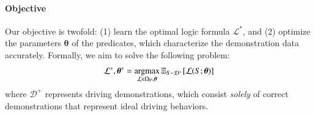 \paragraph{Objective}
Our objective is twofold: (1) learn the optimal logic formula $\mathcal{L}^*$, and (2) optimize the parameters $\boldsymbol{\theta}$ of the predicates, which characterize the demonstration data accurately.
Formally, we aim to solve the following problem:
\begin{align}
    \mathcal{L}^*, \boldsymbol{\theta}^* = \mathop{\mathrm{argmax}}_{\mathcal{L} \in \Omega_{\mathcal{P}}, \boldsymbol{\theta}} \mathbb{E}_{S \sim \mathcal{D}^+} [\mathcal{L}(S; \boldsymbol{\theta})]
    \label{eq:objective}
\end{align}
where $\mathcal{D}^+$ represents driving demonstrations, which consist \textit{solely} of correct demonstrations that represent ideal driving behaviors.